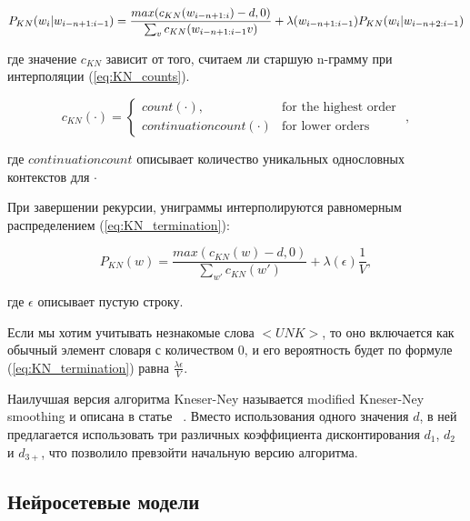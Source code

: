 \begin{equation}
	P_{KN}(w_i|w_{i-n+1:i-1}) = \frac{max(c_{KN}(w_{i-n+1:i})-d, 0)}{\sum_v{c_{KN}(w_{i-n+1:i-1}v)}} + \\ \lambda(w_{i-n+1:i-1})P_{KN}(w_i|w_{i-n+2:i-1})
	\label{eq:i_actualy_once_coded_this_shit}
\end{equation}
\begin{explanation}
	где значение $c_{KN}$ зависит от того, считаем ли старшую n-грамму при \\ интерполяции (\ref{eq:KN_counts}).
\end{explanation}
\begin{equation}
	c_{KN}(\cdot) = \begin{cases} 
		count(\cdot), & \mbox{for the highest order }\\ 
		continuationcount(\cdot) & \mbox{for lower orders}
	\end{cases},
	\label{eq:KN_counts}
\end{equation}
\begin{explanation}
	где $continuationcount$ описывает количество уникальных однословных \\ контекстов для $\cdot$
\end{explanation}

При завершении рекурсии, униграммы интерполируются равномерным распределением (\ref{eq:KN_termination}):

\begin{equation}
	P_{KN}(w) = \frac{max(c_{KN}(w) - d, 0)}{\sum_{w'}{c_{KN}(w')}} + \lambda(\epsilon)\frac{1}{V},
	\label{eq:KN_termination}
\end{equation}
\begin{explanation}
	где $\epsilon$ описывает пустую строку.
\end{explanation}

Если мы хотим учитывать незнакомые слова $<UNK>$, то оно включается как обычный элемент словаря с количеством 0, и его вероятность будет по формуле (\ref{eq:KN_termination}) равна $\frac{\lambda{\epsilon}}{V}$.

Наилучшая версия алгоритма Kneser-Ney называется modified Kneser-Ney smoothing и описана в статье ~\cite{modified-kneser-ney}. Вместо использования одного значения $d$, в ней предлагается использовать три различных коэффициента дисконтирования $d_1$, $d_2$ и $d_{3+}$, что позволило превзойти начальную версию алгоритма. ~\cite{n_grams}

\subsection{Нейросетевые модели}
\label{sub:domain:neural}



